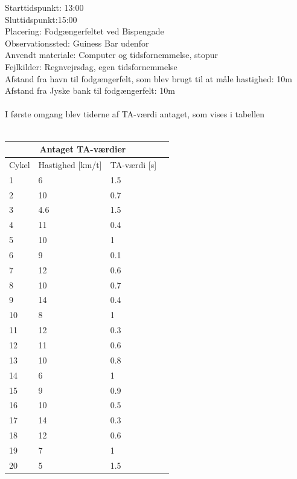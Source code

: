 Starttidspunkt: 13:00
~\\
Sluttidspunkt:15:00
~\\
Placering: Fodgængerfeltet ved Bispengade
~\\
Observationssted: Guiness Bar udenfor
~\\
Anvendt materiale: Computer og tidsfornemmelse, stopur
~\\
Fejlkilder: Regnvejrsdag, egen tidsfornemmelse
~\\
Afstand fra havn til fodgængerfelt, som blev brugt til at måle hastighed: 10m
~\\
Afstand fra Jyske bank til fodgængerfelt: 10m
~\\\\
I første omgang blev tiderne af TA-værdi antaget, som vises i tabellen %
\\\\
\begin{tabular}{ |p{1cm}|p{4cm}|p{4cm}|p{4cm}|  }
\hline
\multicolumn{3}{|c|}{Antaget TA-værdier} \\
\hline
Cykel & Hastighed [km/t] & TA-værdi [s]  \\
\hline
1 & 6   & 1.5  \\
2 & 10  & 0.7  \\
3 & 4.6 & 1.5  \\
4 & 11  & 0.4  \\
5 & 10  & 1  \\
6 & 9   & 0.1 \\
7 & 12  & 0.6  \\
8 & 10  & 0.7  \\
9 & 14  & 0.4  \\
10 & 8  & 1  \\
11 & 12 & 0.3  \\
12 & 11 & 0.6 \\
13 & 10 & 0.8 \\
14 & 6  & 1 \\
15 & 9  & 0.9 \\
16 & 10 & 0.5 \\
17 & 14 & 0.3 \\
18 & 12 & 0.6 \\
19 & 7  & 1 \\
20 & 5  & 1.5 \\
\hline
\end{tabular}



